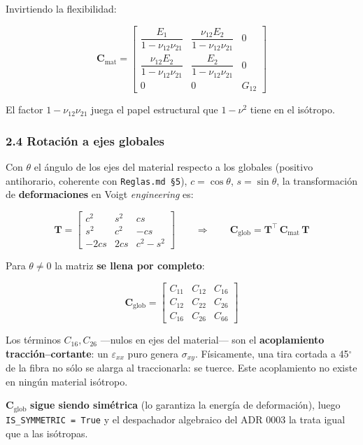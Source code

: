 \documentclass[11pt,letterpaper,oneside]{report}
\begin{document}
Invirtiendo la flexibilidad:

\[
\mathbf C_{\text{mat}} =
\begin{bmatrix}
\dfrac{E_1}{1-\nu_{12}\nu_{21}} & \dfrac{\nu_{12}E_2}{1-\nu_{12}\nu_{21}} & 0 \\[6pt]
\dfrac{\nu_{12}E_2}{1-\nu_{12}\nu_{21}} & \dfrac{E_2}{1-\nu_{12}\nu_{21}} & 0 \\[6pt]
0 & 0 & G_{12}
\end{bmatrix}
\]

El factor $1-\nu_{12}\nu_{21}$ juega el papel estructural que $1-\nu^2$ tiene en el isótropo.

\subsubsection{2.4 Rotación a ejes globales}

Con $\theta$ el ángulo de los ejes del material respecto a los globales (positivo antihorario, coherente con \texttt{Reglas.md §5}), $c=\cos\theta$, $s=\sin\theta$, la transformación de \textbf{deformaciones} en Voigt \textit{engineering} es:

\[
\mathbf T =
\begin{bmatrix}
c^2 & s^2 & cs \\
s^2 & c^2 & -cs \\
-2cs & 2cs & c^2-s^2
\end{bmatrix}
\qquad\Longrightarrow\qquad
\boxed{\mathbf C_{\text{glob}} = \mathbf T^\top\,\mathbf C_{\text{mat}}\,\mathbf T}
\]

Para $\theta \neq 0$ la matriz \textbf{se llena por completo}:

\[
\mathbf C_{\text{glob}} =
\begin{bmatrix}
C_{11} & C_{12} & C_{16} \\
C_{12} & C_{22} & C_{26} \\
C_{16} & C_{26} & C_{66}
\end{bmatrix}
\]

Los términos $C_{16}, C_{26}$ ---nulos en ejes del material--- son el \textbf{acoplamiento tracción--cortante}: un $\varepsilon_{xx}$ puro genera $\sigma_{xy}$. Físicamente, una tira cortada a 45\ensuremath{^{\circ}} de la fibra no sólo se alarga al traccionarla: se tuerce. Este acoplamiento no existe en ningún material isótropo.

$\mathbf C_{\text{glob}}$ \textbf{sigue siendo simétrica} (lo garantiza la energía de deformación), luego \texttt{IS\_SYMMETRIC = True} y el despachador algebraico del ADR 0003 la trata igual que a las isótropas.
\end{document}
